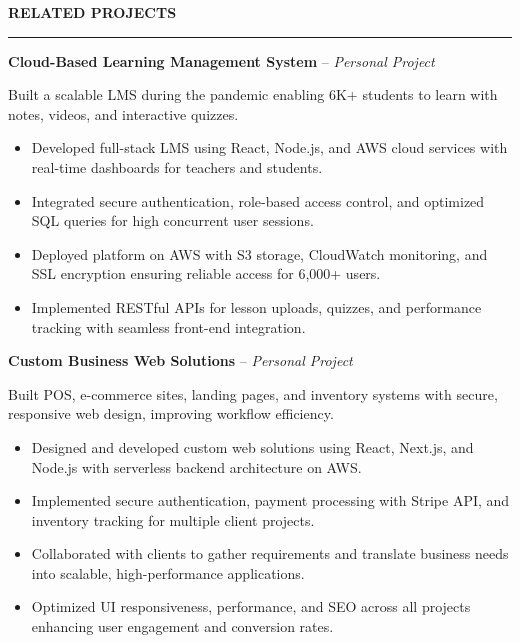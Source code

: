 \documentclass[10pt,letterpaper]{article}
\begin{document}
\vspace{6pt}

\textbf{RELATED PROJECTS}\\[-8pt]
\noindent\rule{\textwidth}{1pt}

\vspace{-2pt}

\textbf{Cloud-Based Learning Management System} -- \emph{Personal Project}

\vspace{-1pt}

Built a scalable LMS during the pandemic enabling 6K+ students to learn with notes, videos, and interactive quizzes.
\vspace{-1pt}
\begin{itemize}
\item Developed full-stack LMS using React, Node.js, and AWS cloud services with real-time dashboards for teachers and students.
\item Integrated secure authentication, role-based access control, and optimized SQL queries for high concurrent user sessions.
\item Deployed platform on AWS with S3 storage, CloudWatch monitoring, and SSL encryption ensuring reliable access for 6,000+ users.
\item Implemented RESTful APIs for lesson uploads, quizzes, and performance tracking with seamless front-end integration.
\end{itemize}

\textbf{Custom Business Web Solutions} -- \emph{Personal Project}

\vspace{-1pt}

Built POS, e-commerce sites, landing pages, and inventory systems with secure, responsive web design, improving workflow efficiency.
\vspace{-1pt}
\begin{itemize}
\item Designed and developed custom web solutions using React, Next.js, and Node.js with serverless backend architecture on AWS.
\item Implemented secure authentication, payment processing with Stripe API, and inventory tracking for multiple client projects.
\item Collaborated with clients to gather requirements and translate business needs into scalable, high-performance applications.
\item Optimized UI responsiveness, performance, and SEO across all projects enhancing user engagement and conversion rates.
\end{itemize}
\end{document}
